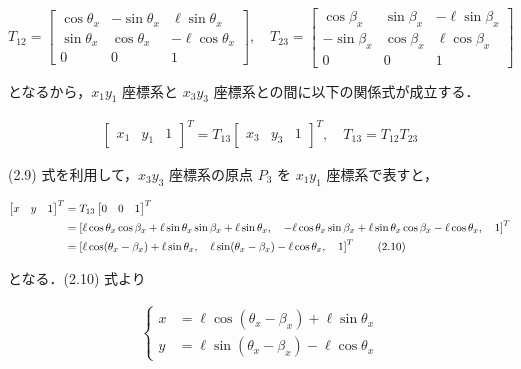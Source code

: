     \[
    T_{12} =
    \begin{bmatrix}
    \cos\theta_x & -\sin\theta_x & \ell \sin\theta_x \\
    \sin\theta_x & \cos\theta_x & -\ell \cos\theta_x \\
    0 & 0 & 1
    \end{bmatrix},
    \quad
    T_{23} =
    \begin{bmatrix}
    \cos\beta_x & \sin\beta_x & -\ell \sin\beta_x \\
    -\sin\beta_x & \cos\beta_x & \ell \cos\beta_x \\
    0 & 0 & 1
    \end{bmatrix}
    \]
    

となるから，$x_1 y_1$ 座標系と $x_3 y_3$ 座標系との間に以下の関係式が成立する．

\begin{align}
\begin{bmatrix}
x_1 & y_1 & 1
\end{bmatrix}^T
=
T_{13}
\begin{bmatrix}
x_3 & y_3 & 1
\end{bmatrix}^T,
\quad
T_{13} = T_{12} T_{23}
\tag{2.9}
\end{align}

(2.9) 式を利用して，$x_3 y_3$ 座標系の原点 $P_3$ を $x_1 y_1$ 座標系で表すと，

\begin{align}
    \begin{bmatrix}
    x & y & 1
    \end{bmatrix}^T
    &= T_{13}
    \begin{bmatrix}
    0 & 0 & 1
    \end{bmatrix}^T \notag \\
    &=
    \left[
    \ell \cos\theta_x \cos\beta_x + \ell \sin\theta_x \sin\beta_x + \ell \sin\theta_x,
    \quad
    -\ell \cos\theta_x \sin\beta_x + \ell \sin\theta_x \cos\beta_x - \ell \cos\theta_x,
    \quad
    1
    \right]^T \notag \\
    &=
    \left[
    \ell \cos(\theta_x - \beta_x) + \ell \sin\theta_x,
    \quad
    \ell \sin(\theta_x - \beta_x) - \ell \cos\theta_x,
    \quad
    1
    \right]^T
    \tag{2.10}
    \end{align}
    
となる．(2.10) 式より

\begin{align}
    \left\{
    \begin{aligned}
    x &= \ell \cos(\theta_x - \beta_x) + \ell \sin\theta_x \\
    y &= \ell \sin(\theta_x - \beta_x) - \ell \cos\theta_x
    \end{aligned}
    \right.
    \tag{2.11}
    \end{align}
    
